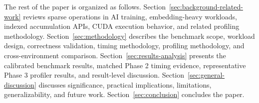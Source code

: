 The rest of the paper is organized as follows. Section~\ref{sec:background-related-work} reviews sparse operations in AI training, embedding-heavy workloads, indexed accumulation APIs, CUDA execution behavior, and related profiling methodology. Section~\ref{sec:methodology} describes the benchmark scope, workload design, correctness validation, timing methodology, profiling methodology, and cross-environment comparison. Section~\ref{sec:results-analysis} presents the calibrated benchmark results, matched Phase 2 timing evidence, representative Phase 3 profiler results, and result-level discussion. Section~\ref{sec:general-discussion} discusses significance, practical implications, limitations, generalizability, and future work. Section~\ref{sec:conclusion} concludes the paper.
